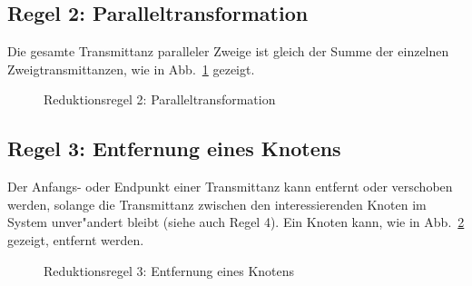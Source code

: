 \subsection{Regel 2:  Paralleltransformation }
Die gesamte Transmittanz paralleler Zweige ist gleich der Summe der
einzelnen Zweigtransmittanzen, wie in Abb.~\ref{SFD8} gezeigt.\\
\begin{figure}[htb!]
\vspace*{-3mm}\begin{center}
  \caption{Reduktionsregel 2: Paralleltransformation}\label{SFD8}
\end{center}
\vspace*{-7mm}
\end{figure}

\subsection{Regel 3: Entfernung eines Knotens }
Der Anfangs- oder Endpunkt einer Transmittanz kann
entfernt oder verschoben werden, solange die Transmittanz zwischen den
interessierenden Knoten im System unver"andert bleibt (siehe auch
Regel 4). Ein Knoten kann, wie in Abb.~\ref{SFD9} gezeigt, entfernt werden.

\begin{figure}[htb!]
\begin{center}
  \caption{Reduktionsregel 3: Entfernung eines Knotens}\label{SFD9}
\end{center}
\vspace*{-7mm}
\end{figure}

